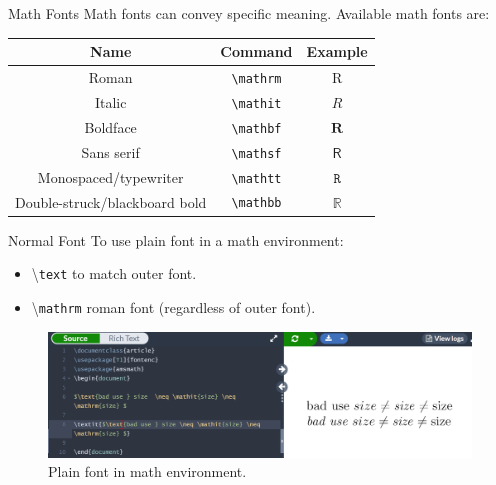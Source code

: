 \documentclass{beamer}
\begin{document}
{  \begin{frame}{Math Fonts}  
    Math fonts can convey specific meaning. Available math fonts are:
    \begin{table}
      \begin{tabular}{c|c|c}
        \textbf{Name} & \textbf{Command} & \textbf{Example} \\ \hline
        Roman & \texttt{\textbackslash mathrm} & $\mathrm{R}$ \\ \hline
        Italic & \texttt{\textbackslash mathit} & $\mathit{R}$ \\ \hline
        Boldface & \texttt{\textbackslash mathbf} & $\mathbf{R}$ \\ \hline
        Sans serif & \texttt{\textbackslash mathsf} & $\mathsf{R}$ \\ \hline
        Monospaced/typewriter & \texttt{\textbackslash mathtt} & $\mathtt{R}$ \\ \hline
        Double-struck/blackboard bold & \texttt{\textbackslash mathbb} & $\mathbb{R}$ 
      \end{tabular}
    \end{table}
  \end{frame}

  \begin{frame}{Normal Font}
    To use plain font in a math environment:
    \begin{itemize} 
      \item \textbackslash\texttt{text} to match outer font.
      \item \textbackslash\texttt{mathrm} roman font (regardless of outer font).
    \end{itemize}
    \begin{figure}
      \includegraphics[width=0.8\linewidth]{day02-01I-plain.png}
      \caption{Plain font in math environment.}
      \label{fig:day02-01I}
    \end{figure}
  \end{frame}

}
\end{document}
